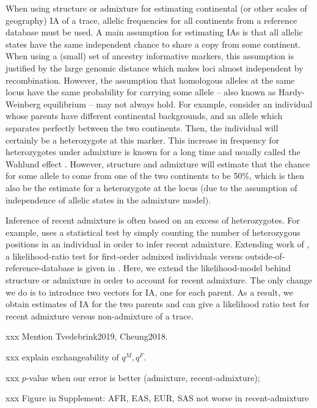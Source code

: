 \documentclass[12pt]{article}
\theoremstyle{definition}
\begin{document}
When using {\sc structure} or {\sc admixture} for estimating
continental (or other scales of geography) IA of a trace, allelic
frequencies for all continents from a reference database must be
used. A main assumption for estimating IAs is that all allelic states
have the same independent chance to share a copy from some
continent. When using a (small) set of ancestry informative markers,
this assumption is justified by the large genomic distance which makes
loci almost independent by recombination. However, the assumption that
homologous alleles at the same locus have the same probability for
carrying some allele -- also known as Hardy-Weinberg equilibrium --
may not always hold. For example, consider an individual whose parents
have different continental backgrounds, and an allele which separates
perfectly between the two continents. Then, the individual will
certainly be a heterozygote at this marker.  This increase in
frequency for heterozygotes under admixture is known for a long time
and usually called the Wahlund effect \cite{Wahlund1928}.  However,
{\sc structure} and {\sc admixture} will estimate that the chance for
some allele to come from one of the two continents to be 50\%, which
is then also be the estimate for a heterozygote at the locus (due to
the assumption of independence of allelic states in the admixture
model).

Inference of recent admixture is often based on an excess of
heterozygotes. For example, \cite{McNevin2019} uses a statistical test
by simply counting the number of heterozygous positions in an
individual in order to infer recent admixture. Extending work of
\cite{Tvedebrink2017}, a likelihood-ratio test for first-order admixed
individuals versus outside-of-reference-database is given in
\cite{Tvedebrink2019}. Here, we extend the likelihood-model behind
{\sc structure} or {\sc admixture} in order to account for recent
admixture. The only change we do is to introduce two vectors for IA,
one for each parent. As a result, we obtain estimates of IA for the
two parents and can give a likelihood ratio test for recent admixture
versus non-admixture of a trace.

xxx Mention Tvedebrink2019, Cheung2018.

xxx explain exchangeability of $q^M, q^F$.

xxx $p$-value when our error is better (admixture, recent-admixture);

xxx Figure in Supplement: AFR, EAS, EUR, SAS not worse in
recent-admixture
\end{document}
